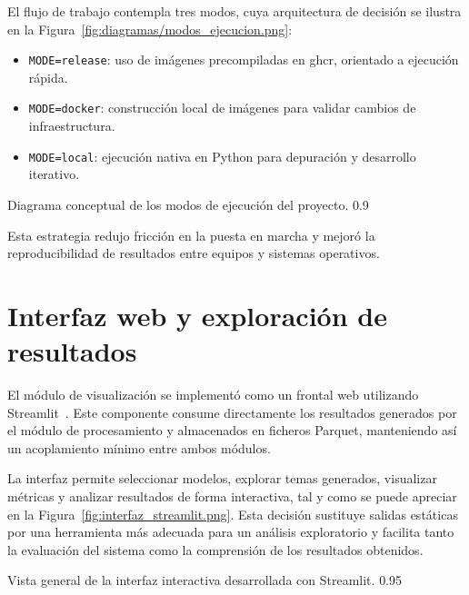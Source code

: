 El flujo de trabajo contempla tres modos, cuya arquitectura de decisión se
ilustra en la Figura~\ref{fig:diagramas/modos_ejecucion.png}:
\begin{itemize}
      \item \texttt{MODE=release}: uso de imágenes precompiladas en \acrshort{ghcr}, orientado a ejecución rápida.
      \item \texttt{MODE=docker}: construcción local de imágenes para validar cambios de infraestructura.
      \item \texttt{MODE=local}: ejecución nativa en Python para depuración y desarrollo iterativo.
\end{itemize}

{Diagrama conceptual de los modos de ejecución del proyecto.}
{0.9}

Esta estrategia redujo fricción en la puesta en marcha y mejoró la
reproducibilidad de resultados entre equipos y sistemas operativos.

\section{Interfaz web y exploración de resultados}

El módulo de visualización se implementó como un frontal web utilizando
Streamlit~\cite{StreamlitDocsa}. Este componente consume directamente los
resultados generados por el módulo de procesamiento y almacenados en ficheros
Parquet, manteniendo así un acoplamiento mínimo entre ambos módulos.

La interfaz permite seleccionar modelos, explorar temas generados, visualizar
métricas y analizar resultados de forma interactiva, tal y como se puede
apreciar en la Figura~\ref{fig:interfaz_streamlit.png}. Esta decisión sustituye
salidas estáticas por una herramienta más adecuada para un análisis
exploratorio y facilita tanto la evaluación del sistema como la comprensión de
los resultados obtenidos.

{Vista general de la interfaz interactiva desarrollada con Streamlit.}
{0.95}
